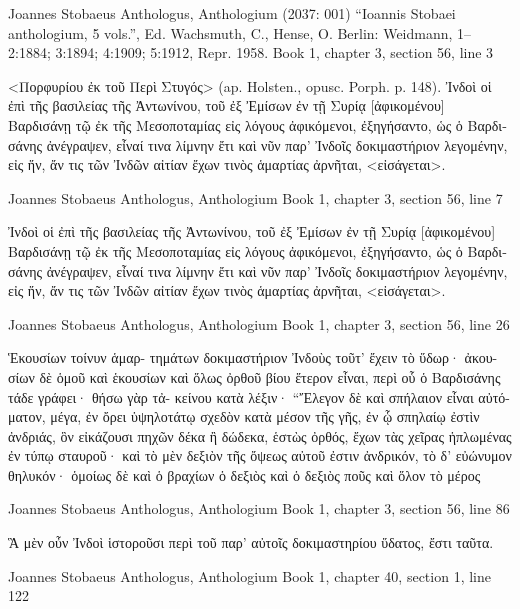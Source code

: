 \documentclass[12pt,letterpaper,twoside,final]{memoir}
\begin{document}
\begin{greek}


Joannes Stobaeus Anthologus, Anthologium (2037: 001)
“Ioannis Stobaei anthologium, 5 vols.”, Ed. Wachsmuth, C., Hense, O.
Berlin: Weidmann, 1–2:1884; 3:1894; 4:1909; 5:1912, Repr. 1958.
Book 1, chapter 3, section 56, line 3

<Πορφυρίου ἐκ τοῦ Περὶ Στυγός> (ap. Holsten., 
opusc. Porph. p. 148). 
 Ἰνδοὶ οἱ ἐπὶ τῆς βασιλείας τῆς Ἀντωνίνου, τοῦ ἐξ   
Ἐμίσων ἐν τῇ Συρίᾳ [ἀφικομένου] Βαρδισάνῃ τῷ ἐκ τῆς 
Μεσοποταμίας εἰς λόγους ἀφικόμενοι, ἐξηγήσαντο, ὡς ὁ 
Βαρδισάνης ἀνέγραψεν, εἶναί τινα λίμνην ἔτι καὶ νῦν παρ' 
Ἰνδοῖς δοκιμαστήριον λεγομένην, εἰς ἥν, ἄν τις τῶν Ἰνδῶν 
αἰτίαν ἔχων τινὸς ἁμαρτίας ἀρνῆται, <εἰσάγεται>. 



Joannes Stobaeus Anthologus, Anthologium 
Book 1, chapter 3, section 56, line 7

Ἰνδοὶ οἱ ἐπὶ τῆς βασιλείας τῆς Ἀντωνίνου, τοῦ ἐξ   
Ἐμίσων ἐν τῇ Συρίᾳ [ἀφικομένου] Βαρδισάνῃ τῷ ἐκ τῆς 
Μεσοποταμίας εἰς λόγους ἀφικόμενοι, ἐξηγήσαντο, ὡς ὁ 
Βαρδισάνης ἀνέγραψεν, εἶναί τινα λίμνην ἔτι καὶ νῦν παρ' 
Ἰνδοῖς δοκιμαστήριον λεγομένην, εἰς ἥν, ἄν τις τῶν Ἰνδῶν 
αἰτίαν ἔχων τινὸς ἁμαρτίας ἀρνῆται, <εἰσάγεται>. 



Joannes Stobaeus Anthologus, Anthologium 
Book 1, chapter 3, section 56, line 26

                                     Ἑκουσίων τοίνυν ἁμαρ-
τημάτων δοκιμαστήριον Ἰνδοὺς τοῦτ' ἔχειν τὸ ὕδωρ· ἀκου-
σίων δὲ ὁμοῦ καὶ ἑκουσίων καὶ ὅλως ὀρθοῦ βίου ἕτερον 
εἶναι, περὶ οὗ ὁ Βαρδισάνης τάδε γράφει· θήσω γὰρ τἀ-
κείνου κατὰ λέξιν· “Ἔλεγον δὲ καὶ σπήλαιον εἶναι αὐτό-
ματον, μέγα, ἐν ὄρει ὑψηλοτάτῳ σχεδὸν κατὰ μέσον τῆς 
γῆς, ἐν ᾧ σπηλαίῳ ἐστὶν ἀνδριάς, ὃν εἰκάζουσι πηχῶν 
δέκα ἢ δώδεκα, ἑστὼς ὀρθός, ἔχων τὰς χεῖρας ἡπλωμένας   
ἐν τύπῳ σταυροῦ· καὶ τὸ μὲν δεξιὸν τῆς ὄψεως αὐτοῦ 
ἐστιν ἀνδρικόν, τὸ δ' εὐώνυμον θηλυκόν· ὁμοίως δὲ καὶ 
ὁ βραχίων ὁ δεξιὸς καὶ ὁ δεξιὸς ποῦς καὶ ὅλον τὸ μέρος 




Joannes Stobaeus Anthologus, Anthologium 
Book 1, chapter 3, section 56, line 86

            Ἃ μὲν οὖν Ἰνδοὶ ἱστοροῦσι περὶ τοῦ παρ' 
αὐτοῖς δοκιμαστηρίου ὕδατος, ἔστι ταῦτα. 



Joannes Stobaeus Anthologus, Anthologium 
Book 1, chapter 40, section 1, line 122


\end{greek}
\end{document}
